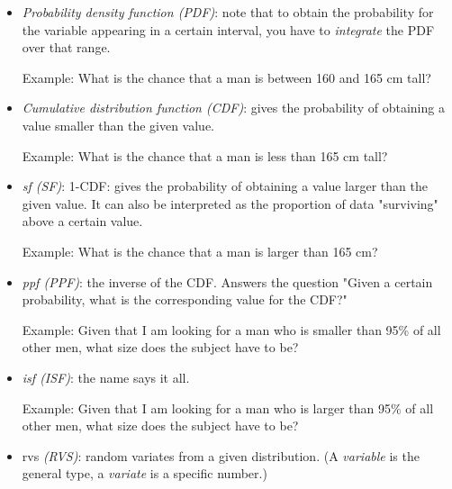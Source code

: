 \begin{itemize}
  \item \emph{Probability density function (PDF)}: note that to obtain the probability for the variable appearing in a certain interval, you have to \emph{integrate} the PDF over that range.

      Example: What is the chance that a man is between 160 and 165 cm tall?

  \item \emph{Cumulative distribution function (CDF)}: gives the probability of obtaining a value smaller than the given value.

        Example: What is the chance that a man is less than 165 cm tall?

  \item \emph{\acrfull{sf} (SF)}: 1-CDF: gives the probability of obtaining a value larger than the given value. It can also be interpreted as the proportion of data "surviving" above a certain value.

      Example: What is the chance that a man is larger than 165 cm?

  \item \emph{\acrfull{ppf} (PPF)}: the inverse of the CDF. Answers the question "Given a certain probability, what is the corresponding value for the CDF?"

    Example: Given that I am looking for a man who is smaller than 95\% of all other men, what size does the subject have to be?

  \item \emph{\acrfull{isf} (ISF)}: the name says it all.

      Example: Given that I am looking for a man who is larger than 95\% of all other men, what size does the subject have to be?
      
  \item \acrfull{rvs} \emph{(RVS)}: random variates from a given distribution. (A \emph{variable} is the general type, a \emph{variate} is a specific number.)

\end{itemize}

